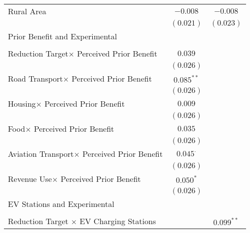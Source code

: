 \begin{center}
\begin{tiny}
\begin{longtable}{l@{} c@{} c@{}}
Rural Area                                               & $-0.008$         & $-0.008$         \\
                                                         & $(0.021)$        & $(0.023)$        \\
Prior Benefit and Experimental                           &                  &                  \\
                                                         &                  &                  \\
\quad Reduction Target$\times$ Perceived Prior Benefit   & $0.039$          &                  \\
                                                         & $(0.026)$        &                  \\
\quad Road Transport$\times$ Perceived Prior Benefit     & $0.085^{**}$     &                  \\
                                                         & $(0.026)$        &                  \\
\quad Housing$\times$ Perceived Prior Benefit            & $0.009$          &                  \\
                                                         & $(0.026)$        &                  \\
\quad Food$\times$ Perceived Prior Benefit               & $0.035$          &                  \\
                                                         & $(0.026)$        &                  \\
\quad Aviation Transport$\times$ Perceived Prior Benefit & $0.045^{\cdot}$  &                  \\
                                                         & $(0.026)$        &                  \\
\quad Revenue Use$\times$ Perceived Prior Benefit        & $0.050^{*}$      &                  \\
                                                         & $(0.026)$        &                  \\
EV Stations and Experimental                             &                  &                  \\
                                                         &                  &                  \\
\quad Reduction Target $\times$ EV Charging Stations     &                  & $0.099^{**}$     \\

\end{longtable}
\end{tiny}
\end{center}

